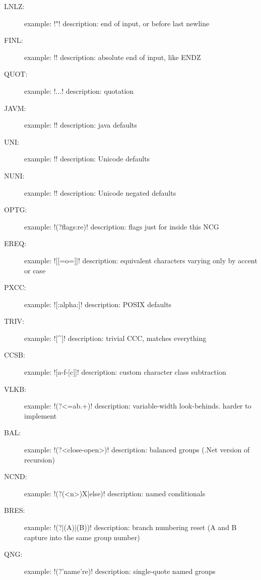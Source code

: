 \begin{description}
\item[LNLZ:] example: \cverb!\Z"! description: end of input, or before last newline
\item[FINL:] example: \cverb!\z! description: absolute end of input, like ENDZ
\item[QUOT:] example: \cverb!\Q...\E! description: quotation
\item[JAVM:] example: \cverb!! description: java defaults
\item[UNI:] example: \cverb!\pL! description: Unicode defaults
\item[NUNI:] example: \cverb!\PS! description: Unicode negated defaults
\item[OPTG:] example: \cverb!(?flags:re)! description: flags just for inside this NCG
\item[EREQ:] example: \cverb![[=o=]]! description: equivalent characters varying only by accent or case
\item[PXCC:] example: \cverb![:alpha:]! description: POSIX defaults
\item[TRIV:] example: \cverb![^]! description: trivial CCC, matches everything
\item[CCSB:] example: \cverb![a-f-[c]]! description: custom character class subtraction
\item[VLKB:] example: \cverb!(?<=ab.+)! description: variable-width look-behinds.  harder to implement
\item[BAL:] example: \cverb!(?<close-open>)! description:  balanced groups (.Net version of recursion)
\item[NCND:] example: \cverb!(?(<n>)X|else)! description: named conditionals
\item[BRES:] example: \cverb!(?|(A)|(B))! description: branch numbering reset (A and B capture into the same group number)
\item[QNG:] example: \cverb!(?'name're)! description: single-quote named groups
\end{description}

